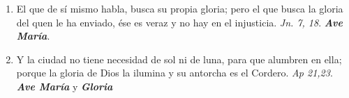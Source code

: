 \documentclass[../../devocionario.tex]{subfiles}
\begin{document}
\begin{enumerate}
        \item El que de sí mismo habla, busca su propia gloria; pero el que busca la gloria del quen le ha enviado, ése es veraz y no hay en el injusticia.
             \textit{Jn. 7, 18}. \textbf{\textit{Ave María}}.

        \item Y la ciudad no tiene necesidad de sol ni de luna, para que alumbren en ella; porque la gloria de Dios la ilumina y su antorcha es el Cordero. 
            \textit{Ap 21,23}. \textbf{\textit{Ave María}} y \textbf{\textit{Gloria}}
    
    \end{enumerate}
\end{document}
